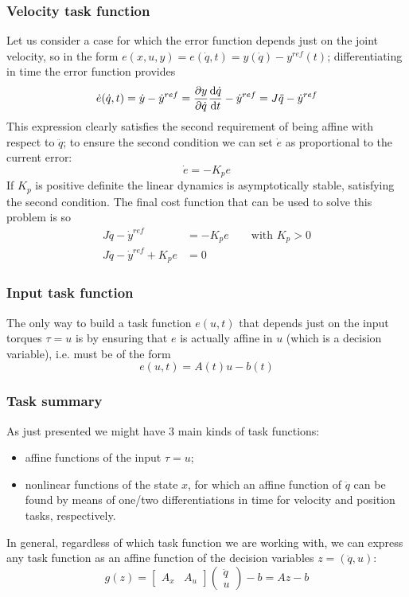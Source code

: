 	\subsubsection{Velocity task function} 
	Let us consider a case for which the error function depends just on the joint velocity, so in the form $e(x,u,y) = e(\dot q, t) = y(\dot q) - y^{ref}(t)$; differentiating in time the error function provides
	\[ \dot e(\dot q, t) = \dot y - \dot y^{ref} = \frac{\partial y}{\partial \dot q} \frac{\mathrm{d} \dot q}{\mathrm{d} t} - \dot y^{ref} = J \ddot q - \dot y^{ref} \]
	This expression clearly satisfies the second requirement of being affine with respect to $\ddot q$; to ensure the second condition we can set $\dot e$ as proportional to the current error:
	\[ \dot e = -K_p e \]
	If $K_p$ is positive definite the linear dynamics is asymptotically stable, satisfying the second condition. The final cost function that can be used to solve this problem is so
	\begin{equation} 
	\begin{aligned} 
		J \ddot q - \dot y^{ref} & = - K_p e \qquad \textrm{with } K_p > 0 \\ 
		J\ddot q - \dot y^{ref} + K_p e & = 0
	\end{aligned}
	\end{equation}
	
	
	\subsubsection{Input task function} The only way to build a task function $e(u, t)$ that depends just on the input torques $\tau = u$ is by ensuring that $e$ is actually affine in $u$ (which is a decision variable), i.e. must be of the form
	\[ e(u,t) = A(t) u - b(t) \]
	
	\subsubsection{Task summary} As just presented we might have 3 main kinds of task functions:
	\begin{itemize}
		\item affine functions of the input $\tau = u$;
		\item nonlinear functions of the state $x$, for which an affine function of $\ddot q$ can be found by means of one/two differentiations in time for velocity and position tasks, respectively.
	\end{itemize}
	In general, regardless of which task function we are working with, we can express any task function as an affine function of the decision variables $z = (\ddot q, u)$:
	\[ g(z) = \begin{bmatrix}
		A_x & A_u
	\end{bmatrix} \begin{pmatrix}
		\ddot q \\ u
	\end{pmatrix} - b = Az - b \]
	
